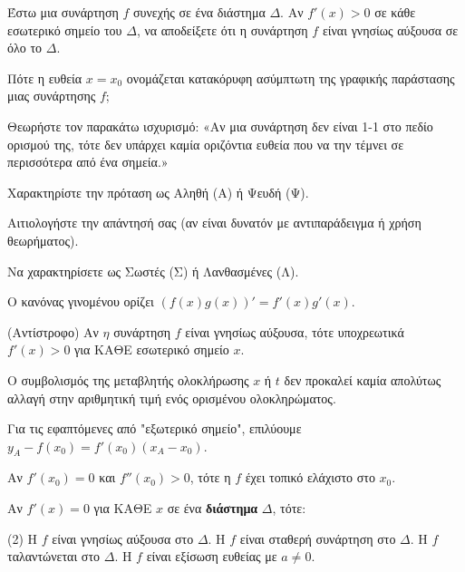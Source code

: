 \documentclass[11pt,a4paper]{article}
\newcommand{\kerkissans}[1]{{\fontfamily{maksf}\selectfont \textbf{#1}}}
\renewcommand{\textdexiakeraia}{}
\newcommand\themanum{A}
\newcounter{thema}[section]
\renewcommand{\thethema}{\arabic{thema}}
\newcommand{\Thema}{\refstepcounter{thema}{\textbf{\textcolor{black}{\faPenSquare\ \  \large \kerkissans{\textbf{\thethemaο\hspace{2mm}Διαγώνισμα - Θέμα \themanum}}}}}\hspace{0mm}}{}
\newenvironment{thema}[1]
{\begin{tcolorbox}[title=\Thema\kerkissans{\textbf{\large{  #1}}},breakable,
enhanced standard,titlerule=0pt,toprule=0pt, rightrule=0pt, bottomrule=0pt,
colback=white,left=0mm,top=1mm,bottom=0mm,
boxrule=0pt,
colframe=white,leftrule=0mm,sharp corners,coltitle=black]
\renewcommand{\themanum}{#1}}
{\end{tcolorbox}}
\begin{document}
\begin{thema}{A}
\begin{erwthma}
    \item Έστω μια συνάρτηση $f$ συνεχής σε ένα διάστημα $\Delta$. Αν $f'(x)>0$ σε κάθε εσωτερικό σημείο του $\Delta$, να αποδείξετε ότι η συνάρτηση $f$ είναι γνησίως αύξουσα σε όλο το $\Delta$.
    \item Πότε η ευθεία $x=x_0$ ονομάζεται κατακόρυφη ασύμπτωτη της γραφικής παράστασης μιας συνάρτησης $f$;
    \item Θεωρήστε τον παρακάτω ισχυρισμό:
    «Αν μια συνάρτηση δεν είναι 1-1 στο πεδίο ορισμού της, τότε δεν υπάρχει καμία οριζόντια ευθεία που να την τέμνει σε περισσότερα από ένα σημεία.»
    \begin{alist}
    \item Χαρακτηρίστε την πρόταση ως Αληθή (Α) ή Ψευδή (Ψ).
    \item Αιτιολογήστε την απάντησή σας (αν είναι δυνατόν με αντιπαράδειγμα ή χρήση θεωρήματος).
    \end{alist}
    \item Να χαρακτηρίσετε ως Σωστές (Σ) ή Λανθασμένες (Λ).
    \begin{alist}
        \item O κανόνας γινομένου ορίζει $(f(x)g(x))' = f'(x)g'(x)$.
        \item (Αντίστροφο) Αν $\eta$ συνάρτηση $f$ είναι γνησίως αύξουσα, τότε υποχρεωτικά $f'(x) > 0$ για ΚΑΘΕ εσωτερικό σημείο $x$.
        \item Ο συμβολισμός της μεταβλητής ολοκλήρωσης $x$ ή $t$ δεν προκαλεί καμία απολύτως αλλαγή στην αριθμητική τιμή ενός ορισμένου ολοκληρώματος.
        \item Για τις εφαπτόμενες από "εξωτερικό σημείο", επιλύουμε $y_A - f(x_0) = f'(x_0)(x_A - x_0)$.
        \item Αν $f'(x_0) = 0$ και $f''(x_0) > 0$, τότε η $f$ έχει τοπικό ελάχιστο στο $x_0$.
    \end{alist}
    \item Αν $f'(x) = 0$ για ΚΑΘΕ $x$ σε ένα \textbf{διάστημα} $\Delta$, τότε:
    \begin{tasks}[label=\let\textdexiakeraia\relax\alph*.](2)
        \task H $f$ είναι γνησίως αύξουσα στο $\Delta$.
        \task H $f$ είναι σταθερή συνάρτηση στο $\Delta$.
        \task H $f$ ταλαντώνεται στο $\Delta$.
        \task H $f$ είναι εξίσωση ευθείας με $a \ne 0$.
    \end{tasks}
\end{erwthma}
\end{thema}
\vspace{1cm}
\end{document}

